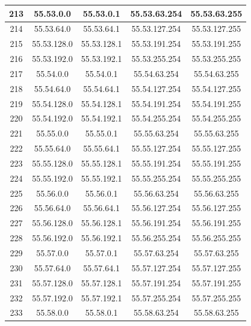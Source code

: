 \documentclass[letterpaper,12pt]{article}
\begin{document}
\begin{center}
\begin{longtable}{|c|c|c|c|c|}
                213 & 55.53.0.0 & 55.53.0.1 & 55.53.63.254 & 55.53.63.255 \\ \hline
                214 & 55.53.64.0 & 55.53.64.1 & 55.53.127.254 & 55.53.127.255 \\ \hline
                215 & 55.53.128.0 & 55.53.128.1 & 55.53.191.254 & 55.53.191.255 \\ \hline
                216 & 55.53.192.0 & 55.53.192.1 & 55.53.255.254 & 55.53.255.255 \\ \hline
                217 & 55.54.0.0 & 55.54.0.1 & 55.54.63.254 & 55.54.63.255 \\ \hline
                218 & 55.54.64.0 & 55.54.64.1 & 55.54.127.254 & 55.54.127.255 \\ \hline
                219 & 55.54.128.0 & 55.54.128.1 & 55.54.191.254 & 55.54.191.255 \\ \hline
                220 & 55.54.192.0 & 55.54.192.1 & 55.54.255.254 & 55.54.255.255 \\ \hline
                221 & 55.55.0.0 & 55.55.0.1 & 55.55.63.254 & 55.55.63.255 \\ \hline
                222 & 55.55.64.0 & 55.55.64.1 & 55.55.127.254 & 55.55.127.255 \\ \hline
                223 & 55.55.128.0 & 55.55.128.1 & 55.55.191.254 & 55.55.191.255 \\ \hline
                224 & 55.55.192.0 & 55.55.192.1 & 55.55.255.254 & 55.55.255.255 \\ \hline
                225 & 55.56.0.0 & 55.56.0.1 & 55.56.63.254 & 55.56.63.255 \\ \hline
                226 & 55.56.64.0 & 55.56.64.1 & 55.56.127.254 & 55.56.127.255 \\ \hline
                227 & 55.56.128.0 & 55.56.128.1 & 55.56.191.254 & 55.56.191.255 \\ \hline
                228 & 55.56.192.0 & 55.56.192.1 & 55.56.255.254 & 55.56.255.255 \\ \hline
                229 & 55.57.0.0 & 55.57.0.1 & 55.57.63.254 & 55.57.63.255 \\ \hline
                230 & 55.57.64.0 & 55.57.64.1 & 55.57.127.254 & 55.57.127.255 \\ \hline
                231 & 55.57.128.0 & 55.57.128.1 & 55.57.191.254 & 55.57.191.255 \\ \hline
                232 & 55.57.192.0 & 55.57.192.1 & 55.57.255.254 & 55.57.255.255 \\ \hline
                233 & 55.58.0.0 & 55.58.0.1 & 55.58.63.254 & 55.58.63.255 \\ \hline

\end{longtable}
\end{center}
\end{document}
